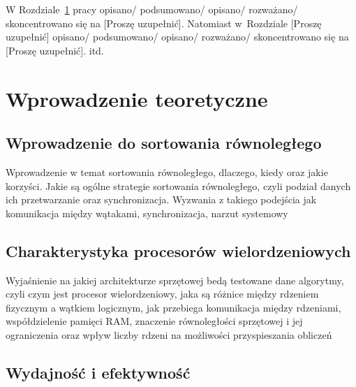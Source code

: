 \documentclass{PracaDyplomowa-Szablon}
\begin{document}
W Rozdziale~\ref{cha:RozdzialWprowadzajacy} pracy opisano/ podsumowano/ opisano/ rozważano/ skoncentrowano się na [Proszę uzupełnić]. Natomiast w~Rozdziale [Proszę uzupełnić] opisano/ podsumowano/ opisano/ rozważano/ skoncentrowano się na [Proszę uzupełnić]. itd.

\cleardoublepage
\chapter{Wprowadzenie teoretyczne}
\label{cha:RozdzialWprowadzajacy}


\section{Wprowadzenie do sortowania równoległego}
\label{sec:SortowanieRownolegle}

Wprowadzenie w temat sortowania równoległego, dlaczego, kiedy oraz jakie korzyści. Jakie są ogólne strategie sortowania równoległego, czyli podział danych ich przetwarzanie oraz synchronizacja. Wyzwania z takiego podejścia jak komunikacja między wątakami, synchronizacja, narzut systemowy

\section{Charakterystyka procesorów wielordzeniowych}
\label{sec:ProcesoryWielordzeniowe}

Wyjaśnienie na jakiej architekturze sprzętowej bedą testowane dane algorytmy, czyli czym jest procesor wielordzeniowy, jaka są różnice między rdzeniem fizycznym a wątkiem logicznym, jak przebiega komunikacja między rdzeniami, współdzielenie pamięci RAM, znaczenie równoległości sprzętowej i jej ograniczenia oraz wpływ liczby rdzeni na możliwości przyspieszania obliczeń

\section{Wydajność i efektywność}
\label{sec:WydajnoscEfektywnosc}
\end{document}
